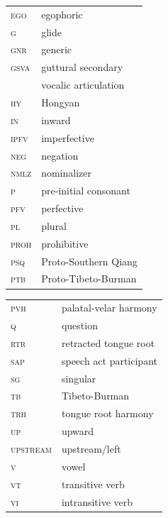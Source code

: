 \documentclass[output=paper]{langscibook}
\begin{document}
\begin{tabularx}{.45\textwidth}{lQ}
\textsc{ego}  &  egophoric\\
\textsc{g}      &   glide\\
\textsc{gnr}  &  generic\\
\textsc{gsva}  &  guttural secondary \\  &  vocalic articulation\\
\textsc{hy}  &  Hongyan\\
\textsc{in}  &  inward\\
\textsc{ipfv}  &  imperfective\\
\textsc{neg}  &  negation\\
\textsc{nmlz}  &    nominalizer\\
\textsc{p}      &   pre-initial consonant\\
\textsc{pfv}  &  perfective\\
\textsc{pl}  &  plural\\
\textsc{proh}  &  prohibitive\\
\textsc{psq}  &  Proto-Southern Qiang\\
\textsc{ptb}  &  Proto-Tibeto-Burman\\
\end{tabularx}
\begin{tabularx}{.45\textwidth}{lQ}
\textsc{pvh}  &  palatal-velar harmony\\
\textsc{q}  &  question\\
\textsc{rtr}  &  retracted tongue root \\
\textsc{sap}  &  speech act participant\\
\textsc{sg}  &  singular\\
\textsc{tb}  &  Tibeto-Burman\\
\textsc{trh}  &  tongue root harmony\\
\textsc{up}  &  upward\\
\textsc{upstream} &     upstream/left\\
\textsc{v}      &   vowel\\
\textsc{vt}  &  transitive verb\\
\textsc{vi}  &  intransitive verb\\
\end{tabularx}

\sloppy\printbibliography[heading=subbibliography,notkeyword=this]
\end{document}
